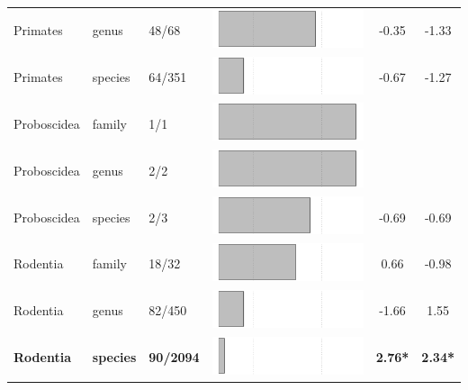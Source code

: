 \begin{longtable}{lL{1.8cm}C{2cm}lcc}
  Primates & genus & 48/68 & \includegraphics[width=0.20\linewidth, height=0.05\linewidth]{Results_1c/Table_figures/bar65.pdf} & -0.35 & -1.33 \\ 
  Primates & species & 64/351 & \includegraphics[width=0.20\linewidth, height=0.05\linewidth]{Results_1c/Table_figures/bar66.pdf} & -0.67 & -1.27 \\ 
  Proboscidea & family & 1/1 & \includegraphics[width=0.20\linewidth, height=0.05\linewidth]{Results_1c/Table_figures/bar67.pdf} &   &   \\ 
  Proboscidea & genus & 2/2 & \includegraphics[width=0.20\linewidth, height=0.05\linewidth]{Results_1c/Table_figures/bar68.pdf} &   &   \\ 
  Proboscidea & species & 2/3 & \includegraphics[width=0.20\linewidth, height=0.05\linewidth]{Results_1c/Table_figures/bar69.pdf} & -0.69 & -0.69 \\ 
  Rodentia & family & 18/32 & \includegraphics[width=0.20\linewidth, height=0.05\linewidth]{Results_1c/Table_figures/bar70.pdf} & 0.66 & -0.98 \\ 
  Rodentia & genus & 82/450 & \includegraphics[width=0.20\linewidth, height=0.05\linewidth]{Results_1c/Table_figures/bar71.pdf} & -1.66 & 1.55 \\ 
  \textbf{Rodentia} & \textbf{species} & \textbf{90/2094} & \includegraphics[width=0.20\linewidth, height=0.05\linewidth]{Results_1c/Table_figures/bar72.pdf} & \textbf{2.76*} & \textbf{2.34*} \\ 

\end{longtable}
